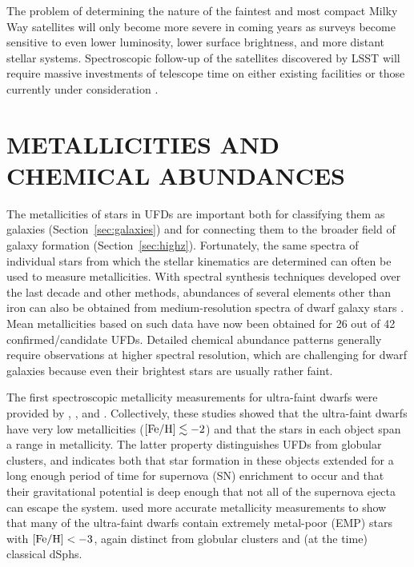 \documentclass[a4paper]{ar-1col}
\newcommand{\feh}         {[Fe/H]}
\begin{document}
The problem of determining the nature of the faintest and most compact
Milky Way satellites will only become more severe in coming years as
surveys become sensitive to even lower luminosity, lower surface
brightness, and more distant stellar systems.  Spectroscopic follow-up
of the satellites discovered by LSST will require massive investments
of telescope time on either existing facilities or those currently
under consideration \citep{najita16}.


\section{METALLICITIES AND CHEMICAL ABUNDANCES}
\label{sec:metallicity}

The metallicities of stars in UFDs are important both for classifying
them as galaxies (Section~\ref{sec:galaxies}) and for connecting them
to the broader field of galaxy formation (Section~\ref{sec:highz}).
Fortunately, the same spectra of individual stars from which the
stellar kinematics are determined can often be used to measure
metallicities.  With spectral synthesis techniques developed over the
last decade and other methods, abundances of several elements other
than iron can also be obtained from medium-resolution spectra of dwarf
galaxy stars
\citep[e.g.,][]{kirby09,norris10,kirby11,vargas13,koposov15b}.  Mean
metallicities based on such data have now been obtained for 26 out of
42 confirmed/candidate UFDs.  Detailed chemical abundance patterns
generally require observations at higher spectral resolution, which
are challenging for dwarf galaxies because even their brightest stars
are usually rather faint.

The first spectroscopic metallicity measurements for ultra-faint
dwarfs were provided by \citet{munoz06}, \citet{martin07}, and
\citet{sg07}.  Collectively, these studies showed that the ultra-faint
dwarfs have very low metallicities (${\rm \feh} \lesssim -2$) and that
the stars in each object span a range in metallicity.  The latter
property distinguishes UFDs from globular clusters, and indicates both
that star formation in these objects extended for a long enough period
of time for supernova (SN) enrichment to occur and that their
gravitational potential is deep enough that not all of the supernova
ejecta can escape the system.  \citet{kirby08} used more accurate
metallicity measurements to show that many of the ultra-faint dwarfs
contain extremely metal-poor (EMP) stars with ${\rm \feh} < -3$, again
distinct from globular clusters and (at the time) classical dSphs.
\end{document}
